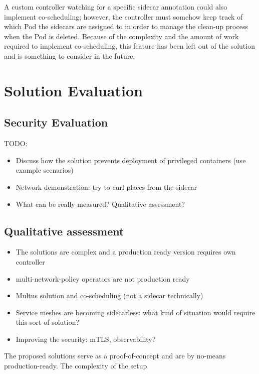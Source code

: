 \documentclass[english, 12pt, a4paper, sci, utf8, a-2b, online]{aaltothesis}
\begin{document}
A custom controller watching for a specific sidecar annotation could also implement co-scheduling; however, the controller must somehow keep track of which Pod the sidecars are assigned to in order to manage the clean-up process when the Pod is deleted.
Because of the complexity and the amount of work required to implement co-scheduling, this feature has been left out of the solution and is something to consider in the future.

\clearpage

\section{Solution Evaluation} \label{sec:solution}

\subsection{Security Evaluation}

TODO:
\begin{itemize}
  \item Discuss how the solution prevents deployment of privileged containers (use example scenarios)
  \item Network demonstration: try to curl places from the sidecar
  \item What can be really measured? Qualitative assessment?
\end{itemize}

\subsection{Qualitative assessment}

\begin{itemize}
  \item The solutions are complex and a production ready version requires own controller
  \item multi-network-policy operators are not production ready
  \item Multus solution and co-scheduling (not a sidecar technically)
  \item Service meshes are becoming sidecarless: what kind of situation would require this sort of solution?
  \item Improving the security: mTLS, observability?
\end{itemize}

The proposed solutions serve as a proof-of-concept and are by no-means production-ready.
The complexity of the setup
\end{document}
